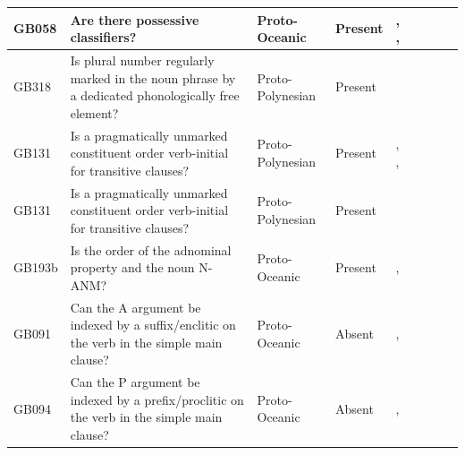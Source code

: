 \documentclass[a4paper,10pt]{article} %
\begin{document}
\begin{landscape}
\begin{longtable}{| p{2cm}| p{3cm}| p{2.5cm}|p{2cm}|p{2cm}|p{2cm}|p{2cm}|p{2cm}|p{2cm}|}
GB058&Are there possessive classifiers?&Proto-Oceanic&Present&\citet[154]{pawley1973some}, \citet[498]{ross2004morphosyntactic}, \citet[69, 77]{lynchrosscrowley_proto_grammar_oceanic}& \cellcolor{hedvig_lightgreen!50}{True Positive} & \cellcolor{hedvig_yellow!50}{Half} & \cellcolor{hedvig_lightgreen!50}{True Positive} & \cellcolor{hedvig_lightgreen!50}{True Positive} \\ \hline
GB318&Is plural number regularly marked in the noun phrase by a dedicated phonologically free element?&Proto-Polynesian&Present&\citet[59]{clark1976aspects}& \cellcolor{hedvig_lightgreen!50}{True Positive} & \cellcolor{hedvig_yellow!50}{Half} & \cellcolor{hedvig_lightgreen!50}{True Positive} & \cellcolor{hedvig_lightgreen!50}{True Positive} \\ \hline
GB131&Is a pragmatically unmarked constituent order verb-initial for transitive clauses?&Proto-Polynesian&Present&\citet[4]{marck2000_encyclo}, \citet[15]{chung1978}, \citet[118]{pawley1973some}& \cellcolor{hedvig_lightgreen!50}{True Positive} & \cellcolor{hedvig_lightgreen!50}{True Positive} & \cellcolor{hedvig_yellow!50}{Half} & \cellcolor{hedvig_lightgreen!50}{True Positive} \\ \hline
GB131&Is a pragmatically unmarked constituent order verb-initial for transitive clauses?&Proto-Polynesian&Present&\citet[122]{kikusawa2002proto}& \cellcolor{hedvig_lightgreen!50}{True Positive} & \cellcolor{hedvig_lightgreen!50}{True Positive} & \cellcolor{hedvig_yellow!50}{Half} & \cellcolor{hedvig_lightgreen!50}{True Positive} \\ \hline
GB193b&Is the order of the adnominal property and the noun N-ANM?&Proto-Oceanic&Present&\citet[497]{ross2004morphosyntactic}, \citet[74]{lynchrosscrowley_proto_grammar_oceanic}& \cellcolor{hedvig_lightgreen!50}{True Positive} & \cellcolor{hedvig_yellow!50}{Half} & \cellcolor{hedvig_lightgreen!50}{True Positive} & \cellcolor{hedvig_lightgreen!50}{True Positive} \\ \hline
GB091&Can the A argument be indexed by a suffix/enclitic on the verb in the simple main clause?&Proto-Oceanic&Absent&\citet[498-499]{ross2004morphosyntactic}, \citet[83]{lynchrosscrowley_proto_grammar_oceanic}& \cellcolor{hedvig_lightgreen!50}{True Negative} & \cellcolor{hedvig_yellow!50}{Half} & \cellcolor{hedvig_yellow!50}{True Negative} & \cellcolor{hedvig_yellow!50}{True Negative} \\ \hline
GB094&Can the P argument be indexed by a prefix/proclitic on the verb in the simple main clause?&Proto-Oceanic&Absent&\citet[498-499]{ross2004morphosyntactic}, \citet[83]{lynchrosscrowley_proto_grammar_oceanic}& \cellcolor{hedvig_lightgreen!50}{True Negative} & \cellcolor{hedvig_yellow!50}{Half} & \cellcolor{hedvig_yellow!50}{True Negative} & \cellcolor{hedvig_yellow!50}{True Negative} \\ \hline

\end{longtable}
\end{landscape}
\end{document}
